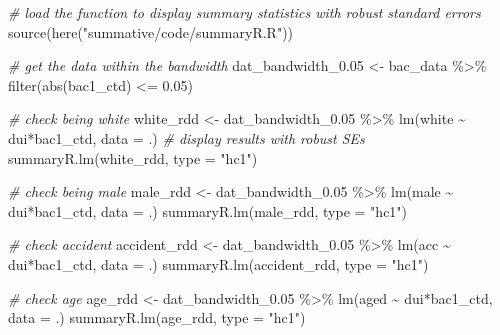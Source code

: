 \documentclass[
  11pt,
]{article}
\newenvironment{Shaded}{\begin{snugshade}}{\end{snugshade}}
\newcommand{\AttributeTok}[1]{\textcolor[rgb]{0.77,0.63,0.00}{#1}}
\newcommand{\CommentTok}[1]{\textcolor[rgb]{0.56,0.35,0.01}{\textit{#1}}}
\newcommand{\FloatTok}[1]{\textcolor[rgb]{0.00,0.00,0.81}{#1}}
\newcommand{\FunctionTok}[1]{\textcolor[rgb]{0.00,0.00,0.00}{#1}}
\newcommand{\NormalTok}[1]{#1}
\newcommand{\OtherTok}[1]{\textcolor[rgb]{0.56,0.35,0.01}{#1}}
\newcommand{\SpecialCharTok}[1]{\textcolor[rgb]{0.00,0.00,0.00}{#1}}
\newcommand{\StringTok}[1]{\textcolor[rgb]{0.31,0.60,0.02}{#1}}
\begin{document}
\begin{Shaded}
\begin{Highlighting}[]
\CommentTok{\# load the function to display summary statistics with robust standard errors}
\FunctionTok{source}\NormalTok{(}\FunctionTok{here}\NormalTok{(}\StringTok{"summative/code/summaryR.R"}\NormalTok{))}

\CommentTok{\# get the data within the bandwidth}
\NormalTok{dat\_bandwidth\_0}\FloatTok{.05} \OtherTok{\textless{}{-}}\NormalTok{ bac\_data }\SpecialCharTok{\%\textgreater{}\%} \FunctionTok{filter}\NormalTok{(}\FunctionTok{abs}\NormalTok{(bac1\_ctd) }\SpecialCharTok{\textless{}=} \FloatTok{0.05}\NormalTok{)}

\CommentTok{\# check being white}
\NormalTok{white\_rdd }\OtherTok{\textless{}{-}}\NormalTok{ dat\_bandwidth\_0}\FloatTok{.05} \SpecialCharTok{\%\textgreater{}\%} \FunctionTok{lm}\NormalTok{(white }\SpecialCharTok{\textasciitilde{}}\NormalTok{ dui}\SpecialCharTok{*}\NormalTok{bac1\_ctd, }\AttributeTok{data =}\NormalTok{ .)}
\CommentTok{\# display results with robust SEs}
\FunctionTok{summaryR.lm}\NormalTok{(white\_rdd, }\AttributeTok{type =} \StringTok{"hc1"}\NormalTok{) }

\CommentTok{\# check being male}
\NormalTok{male\_rdd }\OtherTok{\textless{}{-}}\NormalTok{ dat\_bandwidth\_0}\FloatTok{.05} \SpecialCharTok{\%\textgreater{}\%} \FunctionTok{lm}\NormalTok{(male }\SpecialCharTok{\textasciitilde{}}\NormalTok{ dui}\SpecialCharTok{*}\NormalTok{bac1\_ctd, }\AttributeTok{data =}\NormalTok{ .)}
\FunctionTok{summaryR.lm}\NormalTok{(male\_rdd, }\AttributeTok{type =} \StringTok{"hc1"}\NormalTok{) }

\CommentTok{\# check accident}
\NormalTok{accident\_rdd }\OtherTok{\textless{}{-}}\NormalTok{ dat\_bandwidth\_0}\FloatTok{.05} \SpecialCharTok{\%\textgreater{}\%} \FunctionTok{lm}\NormalTok{(acc }\SpecialCharTok{\textasciitilde{}}\NormalTok{ dui}\SpecialCharTok{*}\NormalTok{bac1\_ctd, }\AttributeTok{data =}\NormalTok{ .)}
\FunctionTok{summaryR.lm}\NormalTok{(accident\_rdd, }\AttributeTok{type =} \StringTok{"hc1"}\NormalTok{) }

\CommentTok{\# check age}
\NormalTok{age\_rdd }\OtherTok{\textless{}{-}}\NormalTok{ dat\_bandwidth\_0}\FloatTok{.05} \SpecialCharTok{\%\textgreater{}\%} \FunctionTok{lm}\NormalTok{(aged }\SpecialCharTok{\textasciitilde{}}\NormalTok{ dui}\SpecialCharTok{*}\NormalTok{bac1\_ctd, }\AttributeTok{data =}\NormalTok{ .)}
\FunctionTok{summaryR.lm}\NormalTok{(age\_rdd, }\AttributeTok{type =} \StringTok{"hc1"}\NormalTok{) }
\end{Highlighting}
\end{Shaded}
\end{document}
